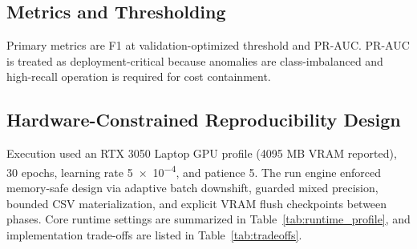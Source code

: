 \documentclass[journal]{IEEEtran}
\begin{document}
\subsection{Metrics and Thresholding}
Primary metrics are F1 at validation-optimized threshold and PR-AUC. PR-AUC is treated as deployment-critical because anomalies are class-imbalanced and high-recall operation is required for cost containment.

\subsection{Hardware-Constrained Reproducibility Design}
Execution used an RTX 3050 Laptop GPU profile (4095 MB VRAM reported), 30 epochs, learning rate \num{5e-4}, and patience 5. The run engine enforced memory-safe design via adaptive batch downshift, guarded mixed precision, bounded CSV materialization, and explicit VRAM flush checkpoints between phases. Core runtime settings are summarized in Table~\ref{tab:runtime_profile}, and implementation trade-offs are listed in Table~\ref{tab:tradeoffs}.

\begin{table}[H]
\caption{Runtime profile used for all reported runs.}
\label{tab:runtime_profile}
\centering
{}
\end{table}
\end{document}
